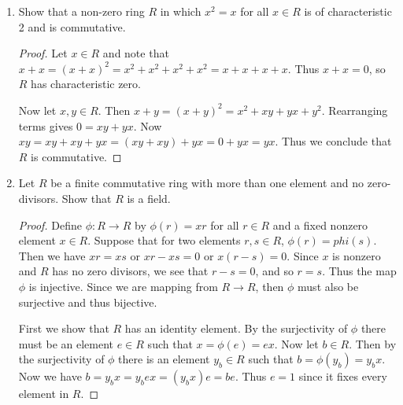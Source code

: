 \documentclass{article}
\theoremstyle{definition}
\begin{document}
\begin{enumerate}
\begin{proof}
                    Note that if $r\in I_1$, then there exists $s\in R_2$ such that $(r,s)\in I$. Thus $(a,1_{R_2})(r,s)=(ar,s)\in I$, and so $ar\in I_1$. Thus $I_1$ is an ideal of $R_1$. By a similar argument, we can see that $I_2$ is an ideal of $R_2$. Now it is clear that $I\subseteq I_1\times I_2$. 
                    
                    To show the reverse inclusion, suppose that $r\in I_1$, and $s\in I_2$ such that $(r,s)\in I_1\times I_2$. Since $r\in I_1$, then there is an $s'\in I_2$ such that $(r,s')\in I$. Also since $s\in I_2$, then there exists an $r'\in I_2$ such that $(r',s)\in I$. Now we see that $(1_R,s)(r,s')=(r,ss')\in I$, and $(1_R,s')(r',s)=(r',ss')\in I$. Thus $(r,ss')-(r',ss')+(r',s)=(r,s)\in I$. Therefore $I_1\times I_2\subseteq I$ so $I=I_1\times I_2$, as desired.
                \end{proof}
            \item Show that a non-zero ring $R$ in which $x^2=x$ for all $x\in R$ is of characteristic 2 and is commutative.
                \begin{proof}
                    Let $x\in R$ and note that $x+x=(x+x)^2=x^2+x^2+x^2+x^2=x+x+x+x$. Thus $x+x=0$, so $R$ has characteristic zero. 

                    Now let $x,y\in R$. Then $x+y=(x+y)^2=x^2+xy+yx+y^2$. Rearranging terms gives $0=xy+yx$. Now $xy=xy+xy+yx=(xy+xy)+yx=0+yx=yx$. Thus we conclude that $R$ is commutative.
                \end{proof}
            
            \item Let $R$ be a finite commutative ring with more than one element and no zero-divisors. Show that $R$ is a field.
            
                \begin{proof}
                    Define $\phi:R\to R$ by $\phi(r)=xr$ for all $r\in R$ and a fixed nonzero element $x\in R$. Suppose that for two elements $r,s\in R$, $\phi(r)=phi(s)$. Then we have $xr=xs$ or $xr-xs=0$ or $x(r-s)=0$. Since $x$ is nonzero and $R$ has no zero divisors, we see that $r-s=0$, and so $r=s$. Thus the map $\phi$ is injective. Since we are mapping from $R\to R$, then $\phi$ must also be surjective and thus bijective. 
                    
                    First we show that $R$ has an identity element. By the surjectivity of $\phi$ there must be an element $e\in R$ such that $x=\phi(e)=ex$. Now let $b\in R$. Then by the surjectivity of $\phi$ there is an element $y_b\in R$ such that $b=\phi(y_b)=y_bx$. Now we have $b=y_bx=y_bex=(y_bx)e=be$. Thus $e=1$ since it fixes every element in $R$. 


\end{proof}
\end{enumerate}
\end{document}
